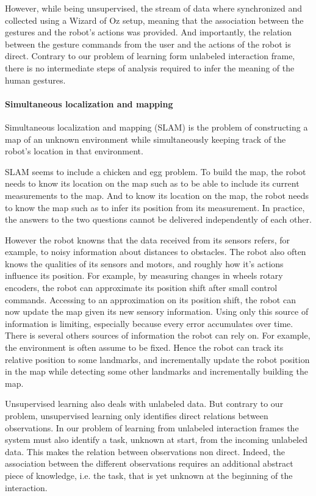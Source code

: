 However, while being unsupervised, the stream of data where synchronized and collected using a Wizard of Oz setup, meaning that the association between the gestures and the robot's actions was provided. And importantly, the relation between the gesture commands from the user and the actions of the robot is direct. Contrary to our problem of learning form unlabeled interaction frame, there is no intermediate steps of analysis required to infer the meaning of the human gestures.

\paragraph{Simultaneous localization and mapping}

Simultaneous localization and mapping (SLAM) \cite{smith1990estimating,dissanayake2001solution} is  the problem of constructing a map of an unknown environment while simultaneously keeping track of the robot's location in that environment. 

SLAM seems to include a chicken and egg problem. To build the map, the robot needs to know its location on the map such as to be able to include its current measurements to the map. And to know its location on the map, the robot needs to know the map such as to infer its position from its measurement. In practice, the answers to the two questions cannot be delivered independently of each other.

However the robot knowns that the data received from its sensors refers, for example, to noisy information about distances to obstacles. The robot also often knows the qualities of its sensors and motors, and roughly how it's actions influence its position. For example, by measuring changes in wheels rotary encoders, the robot can approximate its position shift after small control commands. Accessing to an approximation on its position shift, the robot can now update the map given its new sensory information. Using only this source of information is limiting, especially because every error accumulates over time. There is several others sources of information the robot can rely on. For example, the environment is often assume to be fixed. Hence the robot can track its relative position to some landmarks, and incrementally update the robot position in the map while detecting some other landmarks and incrementally building the map.

\transition

Unsupervised learning also deals with unlabeled data. But contrary to our problem, unsupervised learning only identifies direct relations between observations. In our problem of learning from unlabeled interaction frames the system must also identify a task, unknown at start, from the incoming unlabeled data. This makes the relation between observations non direct. Indeed, the association between the different observations requires an additional abstract piece of knowledge, i.e. the task, that is yet unknown at the beginning of the interaction.

